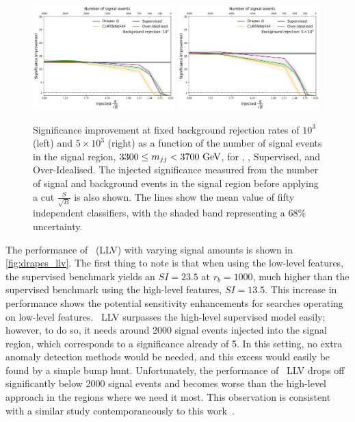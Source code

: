 \begin{figure}[hbpt]
    \centering
    \includegraphics[width=0.49\textwidth]{Figures/jet_generation/drapes/og_compare_rej_1000_sic_vs_nsig.pdf}
    \includegraphics[width=0.49\textwidth]{Figures/jet_generation/drapes/og_compare_rej_5000_sic_vs_nsig.pdf}
    \caption{Significance improvement at fixed background rejection rates of $10^3$ (left) and \mbox{$5 \times 10^3$} (right) as a function of the number of signal events in the signal region, \mbox{$3300\leq m_{jj}<3700~\GeV$}, for \drapes, \FfF, Supervised, and Over-Idealised.
        The injected significance measured from the number of signal and background events in the signal region before applying a cut $\frac{S}{\sqrt{B}}$ is also shown.
        The lines show the mean value of fifty independent classifiers, with the shaded band representing a 68\% uncertainty.
    }
    \label{fig:drapes_hlv}
\end{figure}

The performance of \drapes~(LLV) with varying signal amounts is shown in \cref{fig:drapes_llv}.
The first thing to note is that when using the low-level features, the supervised benchmark yields an $SI=23.5$ at $r_b=1000$, much higher than the supervised benchmark using the high-level features, $SI=13.5$.
This increase in performance shows the potential sensitivity enhancements for searches operating on low-level features.
\drapes~LLV surpasses the high-level supervised model easily; however, to do so, it needs around 2000 signal events injected into the signal region, which corresponds to a significance already of 5.
In this setting, no extra anomaly detection methods would be needed, and this excess would easily be found by a simple bump hunt.
Unfortunately, the performance of \drapes~LLV drops off significantly below 2000 signal events and becomes worse than the high-level approach in the regions where we need it most.
This observation is consistent with a similar study contemporaneously to this work~\cite{FullPhaseSpace}.

